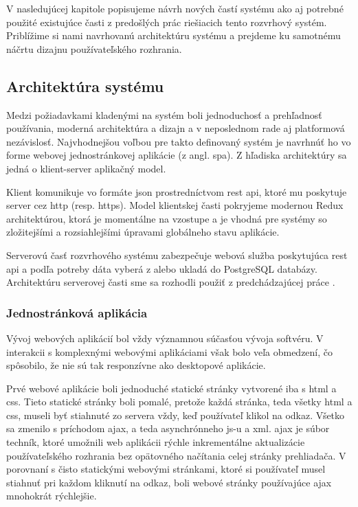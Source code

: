V nasledujúcej kapitole popisujeme návrh nových častí systému ako aj potrebné použité
existujúce časti z predošlých prác riešiacich tento rozvrhový systém. Priblížime si nami navrhovanú
architektúru systému a prejdeme ku samotnému náčrtu dizajnu používateľského rozhrania.
\subsection{Architektúra systému}
\label{subsec:architecture}

Medzi požiadavkami kladenými na systém boli jednoduchosť a prehľadnosť používania, moderná
architektúra a dizajn a v neposlednom rade aj platformová nezávislosť. Najvhodnejšou voľbou
pre takto definovaný systém je navrhnúť ho vo forme webovej jednostránkovej aplikácie (z angl. \acrlong{spa}).
Z hľadiska architektúry sa jedná o klient-server aplikačný model.

Klient komunikuje vo formáte \acrshort{json} prostredníctvom \acrshort{rest} \acrshort{api},
ktoré mu poskytuje server cez \acrshort{http}
(resp. \acrshort{https}). Model klientskej časti pokryjeme modernou Redux architektúrou, ktorá je momentálne
na vzostupe a je vhodná pre systémy so zložitejšími a rozsiahlejšími úpravami globálneho stavu aplikácie.

Serverovú časť rozvrhového systému zabezpečuje webová služba poskytujúca \acrshort{rest} \acrshort{api}
a podľa potreby dáta vyberá z alebo ukladá do PostgreSQL databázy. Architektúru serverovej
časti sme sa rozhodli použiť z predchádzajúcej práce \cite{racak}.
\subsubsection{Jednostránková aplikácia}
\label{subsubsec:spa}

Vývoj webových aplikácií bol vždy významnou súčasťou vývoja softvéru.
V interakcii s komplexnými webovými aplikáciami však bolo veľa obmedzení,
čo spôsobilo, že nie sú tak responzívne ako desktopové aplikácie.

Prvé webové aplikácie boli jednoduché statické stránky vytvorené
iba s \acrshort{html} a \acrshort{css}. Tieto statické stránky boli pomalé, pretože každá
stránka, teda všetky \acrshort{html} a \acrshort{css}, museli byť stiahnuté zo servera vždy,
keď používateľ klikol na odkaz. Všetko sa zmenilo s príchodom \acrshort{ajax}, a teda
asynchrónneho \acrlong{js}-u a \acrshort{xml}. \acrshort{ajax} je súbor techník, ktoré umožnili web
aplikácii rýchle inkrementálne aktualizácie používateľského rozhrania bez
opätovného načítania celej stránky prehliadača. V porovnaní s čisto statickými
webovými stránkami, ktoré si používateľ musel stiahnuť pri každom kliknutí na odkaz,
boli webové stránky používajúce \acrshort{ajax} mnohokrát rýchlejšie.

